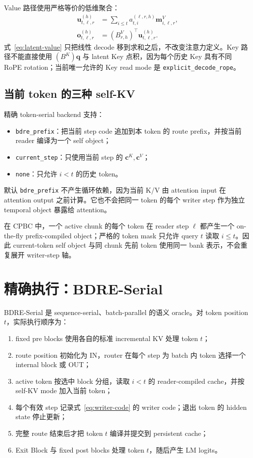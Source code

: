 \documentclass[UTF8,twocolumn,10pt,a4paper]{ctexart}
\newcommand{\CPBC}{\textsf{CPBC}}
\newcommand{\Serial}{\textsf{BDRE-Serial}}
\newcommand{\code}[1]{\texttt{#1}}
\begin{document}
Value 路径使用严格等价的低维聚合：
\begin{align}
  \bm u_{t,\ell,r}^{(h)}
  &=\sum_{i\le t}a_{t,i}^{(\ell,r,h)}
  \bm m^V_{i,\ell,r},\\
  \bm o_{t,\ell,r}^{(h)}
  &=(B^V_{r,h})^\top\bm u_{t,\ell,r}^{(h)}.
  \label{eq:latent-value}
\end{align}
式~\eqref{eq:latent-value} 只把线性 decode 移到求和之后，不改变注意力定义。Key 路径不能直接使用 $(B^K)\bm q$ 与 latent Key 点积，因为每个历史 Key 具有不同 RoPE rotation；当前唯一允许的 Key read mode 是 \code{explicit\_decode\_rope}。

\subsection{当前 token 的三种 self-KV}
精确 token-serial backend 支持：
\begin{itemize}
  \item \code{bdre\_prefix}：把当前 step code 追加到本 token 的 route prefix，并按当前 reader 编译为一个 self object；
  \item \code{current\_step}：只使用当前 step 的 $\bm c^K,\bm c^V$；
  \item \code{none}：只允许 $i<t$ 的历史 token。
\end{itemize}
默认 \code{bdre\_prefix} 不产生循环依赖，因为当前 K/V 由 attention input 在 attention output 之前计算。它也不会把同一 token 的每个 writer step 作为独立 temporal object 暴露给 attention。

在 \CPBC{} 中，一个 active chunk 的每个 token 在 reader step $\ell$ 都产生一个 on-the-fly prefix-compiled object；严格的 token mask 只允许 query $t$ 读取 $i\le t$。因此 current-token self object 与同 chunk 先前 token 使用同一 bank 表示，不会重复展开 writer-step 轴。

\section{精确执行：\Serial{}}
\Serial{} 是 sequence-serial、batch-parallel 的语义 oracle。对 token position $t$，实际执行顺序为：
\begin{enumerate}
  \item fixed pre blocks 使用各自的标准 incremental KV 处理 token $t$；
  \item route position 初始化为 IN，router 在每个 step 为 batch 内 token 选择一个 internal block 或 OUT；
  \item active token 按选中 block 分组，读取 $i<t$ 的 reader-compiled cache，并按 self-KV mode 加入当前 token；
  \item 每个有效 step 记录式~\eqref{eq:writer-code} 的 writer code；退出 token 的 hidden state 停止更新；
  \item 完整 route 结束后才把 token $t$ 编译并提交到 persistent cache；
  \item Exit Block 与 fixed post blocks 处理 token $t$，随后产生 LM logits。
\end{enumerate}
\end{document}
